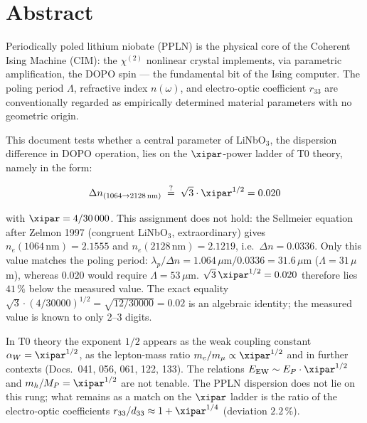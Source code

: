 
\section*{Abstract}

Periodically poled lithium niobate (PPLN) is the physical core of the
Coherent Ising Machine (CIM): the $\chi^{(2)}$ nonlinear crystal implements,
via parametric amplification, the DOPO spin — the fundamental bit of the
Ising computer. The poling period $\Lambda$, refractive index $n(\omega)$,
and electro-optic coefficient $r_{33}$ are conventionally regarded as
empirically determined material parameters with no geometric origin.

This document tests whether a central parameter of LiNbO$_3$, the dispersion
difference in DOPO operation, lies on the $\xipar$-power ladder of T0 theory,
namely in the form:

\begin{equation}
    \Delta n_{(1064 \to 2128\,\text{nm})} \;\stackrel{?}{=}\; \sqrt{3}\cdot\xipar^{1/2} = 0.020
    \label{eq:main}
\end{equation}

with $\xipar = 4/30\,000$. This assignment does not hold: the Sellmeier equation
after Zelmon 1997 (congruent LiNbO$_3$, extraordinary) gives
$n_e(1064\,\text{nm}) = 2.1555$ and $n_e(2128\,\text{nm}) = 2.1219$, i.e.\
$\Delta n = 0.0336$. Only this value matches the poling period:
$\lambda_p/\Delta n = 1.064\,\mu\text{m}/0.0336 = 31.6\,\mu$m ($\Lambda = 31\,\mu$m),
whereas $0.020$ would require $\Lambda = 53\,\mu$m. $\sqrt{3}\,\xipar^{1/2} = 0.020$
therefore lies $41\,\%$ below the measured value. The exact equality
$\sqrt{3}\cdot(4/30000)^{1/2} = \sqrt{12/30000} = 0.02$ is an algebraic identity;
the measured value is known to only 2--3 digits.

In T0 theory the exponent $1/2$ appears as the weak coupling constant
$\alpha_W = \xipar^{1/2}$, as the lepton-mass ratio $m_e/m_\mu \propto \xipar^{1/2}$
and in further contexts (Docs.~041, 056, 061, 122, 133). The relations
$E_\mathrm{EW} \sim E_P \cdot \xipar^{1/2}$ and $m_h/M_P = \xipar^{1/2}$ are not
tenable. The PPLN dispersion does not lie on this rung; what remains as a match on
the $\xipar$ ladder is the ratio of the electro-optic coefficients
$r_{33}/d_{33} \approx 1 + \xipar^{1/4}$ (deviation $2.2\,\%$).


